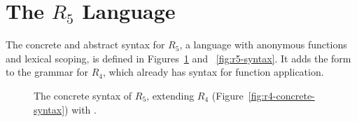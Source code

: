 \documentclass[11pt]{book}
\newcommand{\gray}[1]{{\color{gray} #1}}
\begin{document}
\section{The $R_5$ Language}
\label{sec:r5}

The concrete and abstract syntax for $R_5$, a language with anonymous
functions and lexical scoping, is defined in
Figures~\ref{fig:r5-concrete-syntax} and ~\ref{fig:r5-syntax}. It adds
the  form to the grammar for $R_4$, which already has
syntax for function application.

\begin{figure}[tp]
\centering
\fbox{
  \begin{minipage}{0.96\textwidth}
    \small
\[
\begin{array}{lcl}
  \Type &::=& \gray{\key{Integer} \mid \key{Boolean}
     \mid (\key{Vector}\;\Type\ldots) \mid \key{Void}
     \mid (\Type\ldots \; \key{->}\; \Type)} \\
  \Exp &::=& \gray{ \Int \mid \CREAD{} \mid \CNEG{\Exp}
     \mid \CADD{\Exp}{\Exp} \mid \CSUB{\Exp}{\Exp} }  \\
    &\mid&  \gray{ \Var \mid \CLET{\Var}{\Exp}{\Exp} }\\
    &\mid& \gray{\key{\#t} \mid \key{\#f} 
     \mid (\key{and}\;\Exp\;\Exp) 
     \mid (\key{or}\;\Exp\;\Exp) 
     \mid (\key{not}\;\Exp) } \\
    &\mid& \gray{ (\key{eq?}\;\Exp\;\Exp) \mid \CIF{\Exp}{\Exp}{\Exp} } \\
    &\mid& \gray{ (\key{vector}\;\Exp\ldots) \mid
          (\key{vector-ref}\;\Exp\;\Int)} \\
    &\mid& \gray{(\key{vector-set!}\;\Exp\;\Int\;\Exp)\mid (\key{void})
    \mid (\Exp \; \Exp\ldots) } \\
    &\mid& \LP \key{procedure-arity}~\Exp\RP \\
    &\mid& \CLAMBDA{\LP\LS\Var \key{:} \Type\RS\ldots\RP}{\Type}{\Exp} \\
  \Def &::=& \gray{ \CDEF{\Var}{\LS\Var \key{:} \Type\RS\ldots}{\Type}{\Exp} } \\
  R_5 &::=& \gray{\Def\ldots \; \Exp}
\end{array}
\]
\end{minipage}
}
\caption{The concrete syntax of $R_5$, extending $R_4$ (Figure~\ref{fig:r4-concrete-syntax}) 
  with .}
\label{fig:r5-concrete-syntax}
\end{figure}
\end{document}
